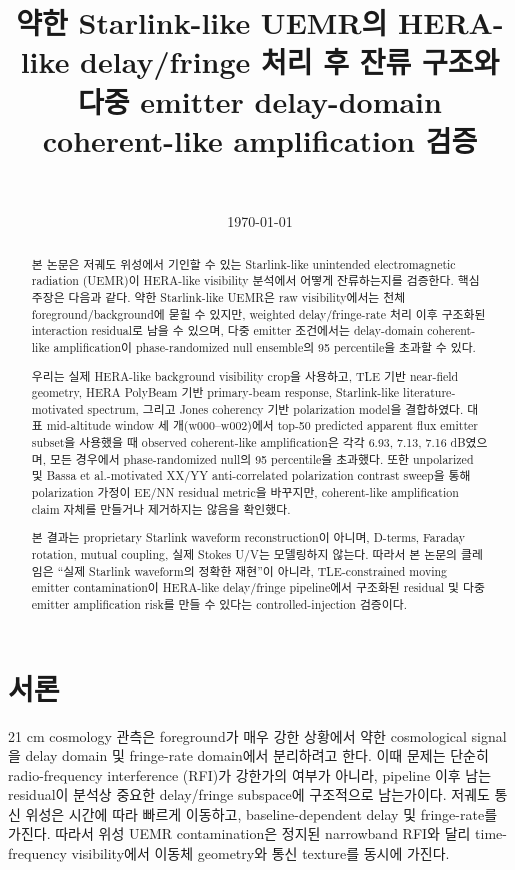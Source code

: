 \documentclass[11pt,a4paper]{article}
\title{
약한 Starlink-like UEMR의 HERA-like delay/fringe 처리 후 잔류 구조와\\
다중 emitter delay-domain coherent-like amplification 검증
}
\author{
\todo{저자명}\\
\todo{소속}
}
\date{\today}
\begin{document}
\maketitle

\begin{abstract}
본 논문은 저궤도 위성에서 기인할 수 있는 Starlink-like unintended electromagnetic radiation (UEMR)이 HERA-like visibility 분석에서 어떻게 잔류하는지를 검증한다.
핵심 주장은 다음과 같다.
약한 Starlink-like UEMR은 raw visibility에서는 천체 foreground/background에 묻힐 수 있지만, weighted delay/fringe-rate 처리 이후 구조화된 interaction residual로 남을 수 있으며, 다중 emitter 조건에서는 delay-domain coherent-like amplification이 phase-randomized null ensemble의 95 percentile을 초과할 수 있다.

우리는 실제 HERA-like background visibility crop을 사용하고, TLE 기반 near-field geometry, HERA PolyBeam 기반 primary-beam response, Starlink-like literature-motivated spectrum, 그리고 Jones coherency 기반 polarization model을 결합하였다.
대표 mid-altitude window 세 개(w000--w002)에서 top-50 predicted apparent flux emitter subset을 사용했을 때 observed coherent-like amplification은 각각 6.93, 7.13, 7.16 dB였으며, 모든 경우에서 phase-randomized null의 95 percentile을 초과했다.
또한 unpolarized 및 Bassa et al.-motivated XX/YY anti-correlated polarization contrast sweep을 통해 polarization 가정이 EE/NN residual metric을 바꾸지만, coherent-like amplification claim 자체를 만들거나 제거하지는 않음을 확인했다.

본 결과는 proprietary Starlink waveform reconstruction이 아니며, D-terms, Faraday rotation, mutual coupling, 실제 Stokes U/V는 모델링하지 않는다.
따라서 본 논문의 클레임은 ``실제 Starlink waveform의 정확한 재현''이 아니라, TLE-constrained moving emitter contamination이 HERA-like delay/fringe pipeline에서 구조화된 residual 및 다중 emitter amplification risk를 만들 수 있다는 controlled-injection 검증이다.
\end{abstract}

\section{서론}

21 cm cosmology 관측은 foreground가 매우 강한 상황에서 약한 cosmological signal을 delay domain 및 fringe-rate domain에서 분리하려고 한다.
이때 문제는 단순히 radio-frequency interference (RFI)가 강한가의 여부가 아니라, pipeline 이후 남는 residual이 분석상 중요한 delay/fringe subspace에 구조적으로 남는가이다.
저궤도 통신 위성은 시간에 따라 빠르게 이동하고, baseline-dependent delay 및 fringe-rate를 가진다.
따라서 위성 UEMR contamination은 정지된 narrowband RFI와 달리 time-frequency visibility에서 이동체 geometry와 통신 texture를 동시에 가진다.
\end{document}
